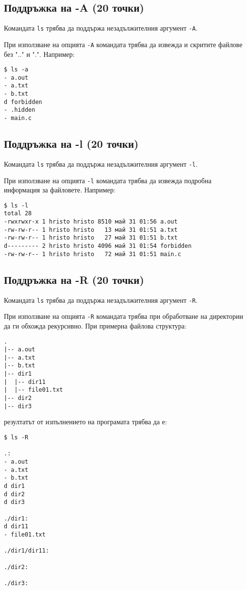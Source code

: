\documentclass[a4paper,10pt]{article}
\begin{document}
\subsection{Поддръжка на {\ttfamily -A} (20 точки)}
Командата \lstinline{ls} трябва да поддържа незадължителния аргумент \lstinline{-A}.

При използване на опцията \lstinline{-A} командата трябва да извежда и скритите файлове без ".." и ".". Например:
\begin{verbatim}
$ ls -a
- a.out
- a.txt
- b.txt
d forbidden
- .hidden
- main.c
\end{verbatim}

\subsection{Поддръжка на {\ttfamily -l} (20 точки)}
Командата \lstinline{ls} трябва да поддържа незадължителния аргумент \lstinline{-l}.

При използване на опцията \lstinline{-l} командата трябва да извежда подробна информация за файловете. Например:
\begin{verbatim}
$ ls -l
total 28
-rwxrwxr-x 1 hristo hristo 8510 май 31 01:56 a.out
-rw-rw-r-- 1 hristo hristo   13 май 31 01:51 a.txt
-rw-rw-r-- 1 hristo hristo   27 май 31 01:51 b.txt
d--------- 2 hristo hristo 4096 май 31 01:54 forbidden
-rw-rw-r-- 1 hristo hristo   72 май 31 01:51 main.c
\end{verbatim}

\subsection{Поддръжка на {\ttfamily -R} (20 точки)}
Командата \lstinline{ls} трябва да поддържа незадължителния аргумент \lstinline{-R}.

При използване на опцията \lstinline{-R} командата трябва при обработване на директории да ги обхожда рекурсивно. При примерна файлова структура:
\begin{verbatim}
.
|-- a.out
|-- a.txt
|-- b.txt
|-- dir1
|  |-- dir11
|  |-- file01.txt
|-- dir2
|-- dir3
\end{verbatim}
резултатът от изпълнението на програмата трябва да е:
\begin{verbatim}
$ ls -R

.:
- a.out
- a.txt
- b.txt
d dir1
d dir2
d dir3

./dir1:
d dir11
- file01.txt

./dir1/dir11:

./dir2:

./dir3:

\end{verbatim}
\end{document}
